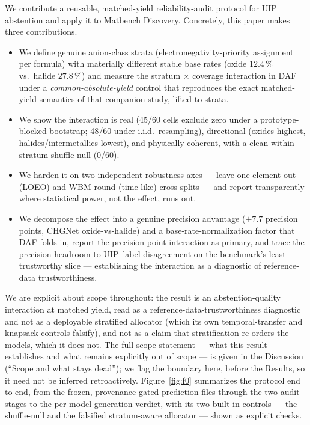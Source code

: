 \documentclass[aip,jcp,preprint,superscriptaddress,amsmath,amssymb]{revtex4-2}
\begin{document}
We contribute a reusable, matched-yield reliability-audit protocol for UIP abstention and
apply it to Matbench Discovery. Concretely, this paper makes three contributions.
\begin{itemize}
  \item We define genuine anion-class strata (electronegativity-priority assignment per
        formula) with materially different stable base rates (oxide $12.4\,\%$ vs.\ halide
        $27.8\,\%$) and measure the stratum $\times$ coverage interaction in DAF under a
        \emph{common-absolute-yield} control that reproduces the exact matched-yield semantics
        of that companion study, lifted to strata.
  \item We show the interaction is real (45/60 cells exclude zero under a prototype-blocked
        bootstrap; 48/60 under i.i.d.\ resampling), directional (oxides highest,
        halides/intermetallics lowest), and physically coherent, with a clean within-stratum
        shuffle-null (0/60).
  \item We harden it on two independent robustness axes --- leave-one-element-out (LOEO)
        and WBM-round (time-like) cross-splits --- and report transparently where statistical
        power, not the effect, runs out.
  \item We decompose the effect into a genuine precision advantage ($+7.7$ precision points,
        CHGNet oxide-vs-halide) and a base-rate-normalization factor that DAF folds in, report
        the precision-point interaction as primary, and trace the precision headroom to
        UIP--label disagreement on the benchmark's least trustworthy slice --- establishing the
        interaction as a diagnostic of reference-data trustworthiness.
\end{itemize}
We are explicit about scope throughout: the result is an abstention-quality
interaction at matched yield, read as a reference-data-trustworthiness diagnostic and not as a
deployable stratified allocator (which its own temporal-transfer and knapsack controls falsify),
and not as a claim that stratification re-orders the models, which it does not. The full scope
statement --- what this result establishes and what remains explicitly out of scope --- is given
in the Discussion (``Scope and what stays dead''); we flag the boundary here, before the Results,
so it need not be inferred retroactively. Figure~\ref{fig:f0} summarizes the protocol end to end, from the frozen,
provenance-gated prediction files through the two audit stages to the per-model-generation
verdict, with its two built-in controls --- the shuffle-null and the falsified stratum-aware
allocator --- shown as explicit checks.
\end{document}
